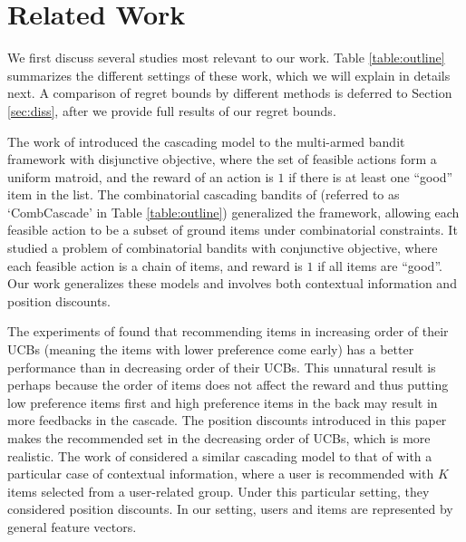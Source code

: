 \documentclass{article}
\newcommand{\shuai}[1]{{\color{brown!60!black} [\text{Shuai:} #1]}}
\begin{document}


\section{Related Work}

We first discuss several studies most relevant to our work.
Table \ref{table:outline} summarizes the different settings of these work, 
	which we will explain in details next.
A comparison of regret bounds by different methods is deferred to Section \ref{sec:diss},
	after we provide full results of our regret bounds.

The work of \cite{kveton2015cascading} introduced the cascading model to the multi-armed bandit framework with disjunctive objective, where the set of feasible actions form a uniform matroid, and the reward of an action is $1$ if there is at least one ``good'' item in the list. 
The combinatorial cascading bandits of \cite{kveton2015combinatorial} (referred to as `CombCascade' in Table \ref{table:outline}) generalized the framework, allowing each feasible action to be a subset of ground items under combinatorial constraints. It studied a problem of combinatorial bandits with conjunctive objective, where each feasible action is a chain of items, and reward is $1$ if all items are ``good''. 
Our work generalizes these models and involves both contextual information and position discounts.

The experiments of \cite{kveton2015cascading} found that recommending items in increasing order of their UCBs (meaning the items with lower preference come early) has a better performance than in decreasing order of their UCBs.
This unnatural result is perhaps because the order of items does not affect the reward and thus
	putting low preference items first and high preference items in the back may result in more feedbacks
	in the cascade.
The position discounts introduced in this paper makes the recommended set in the decreasing order 
	of UCBs, which is more realistic.
The work of \cite{combes2015learning} considered a similar cascading model to that of \cite{kveton2015cascading} with a particular case of contextual information, where a user is recommended with $K$ items selected from a user-related group. Under this particular setting, they considered position discounts.
In our setting, users and items are represented by general feature vectors.
\end{document}

